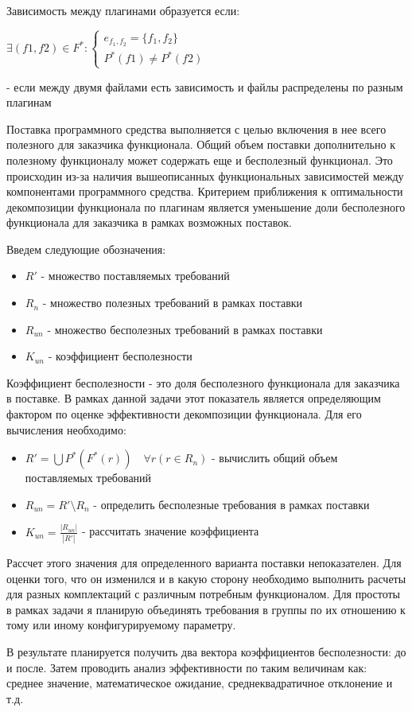 \documentclass{article}
\begin{document}
  Зависимость между плагинами образуется если:

  $ \exists (f1, f2) \in F^* :
    \begin{cases}
      e_{f_1, f_2} = \{f_1, f_2\} \\
      P^*(f1) \not = P^*(f2)
    \end{cases}
  $ 

  - если между двумя файлами есть зависимость и файлы распределены по разным плагинам

  Поставка программного средства выполняется с целью включения в нее всего полезного для заказчика функционала. Общий объем поставки дополнительно к полезному функционалу может содержать еще и бесполезный функционал. Это происходин из-за наличия вышеописанных функциональных зависимостей между компонентами программного средства. Критерием приближения к оптимальности декомпозиции функционала по плагинам является уменьшение доли бесполезного функционала для заказчика в рамках возможных поставок.

  Введем следующие обозначения:
  \begin{itemize}
    \item $R'$ - множество поставляемых требований
    \item $R_n$ - множество полезных требований в рамках поставки
    \item $R_{un}$ - множество бесполезных требований в рамках поставки
    \item $K_{un}$ - коэффициент бесполезности
  \end{itemize}

  Коэффициент бесполезности - это доля бесполезного функционала для заказчика в поставке. В рамках данной задачи этот показатель является определяющим фактором по оценке эффективности декомпозиции функционала. Для его вычисления необходимо:
  \begin{itemize}
    \item $R' = \bigcup P^*(F^*(r)) \quad \forall r (r \in R_n)$ - вычислить общий объем поставляемых требований
    \item $R_{un} = R' \setminus R_n$ - определить бесполезные требования в рамках поставки
    \item $K_{un} = \frac{|R_{un}|}{|R'|}$ - рассчитать значение коэффициента
  \end{itemize}
  
  Рассчет этого значения для определенного варианта поставки непоказателен. Для оценки того, что он изменился и в какую сторону необходимо выполнить расчеты для разных комплектаций с различным потребным функционалом. Для простоты в рамках задачи я планирую объединять требования в группы по их отношению к тому или иному конфигурируемому параметру.

  В результате планируется получить два вектора коэффициентов бесполезности: до и после. Затем проводить анализ эффективности по таким величинам как: среднее значение, математическое ожидание, среднеквадратичное отклонение и т.д.
\end{document}
